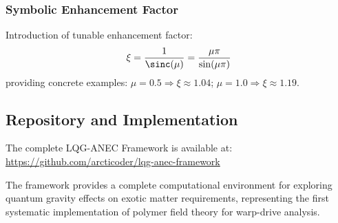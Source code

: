 \documentclass[11pt]{article}
\begin{document}
\subsubsection{Symbolic Enhancement Factor}
Introduction of tunable enhancement factor:
\[
\xi = \frac{1}{\sinc(\mu)} = \frac{\mu\pi}{\sin(\mu\pi)}
\]
providing concrete examples: $\mu = 0.5 \Rightarrow \xi \approx 1.04$; $\mu = 1.0 \Rightarrow \xi \approx 1.19$.

\subsection*{Repository and Implementation}

The complete LQG-ANEC Framework is available at:
\url{https://github.com/arcticoder/lqg-anec-framework}

The framework provides a complete computational environment for exploring quantum gravity effects on exotic matter requirements, representing the first systematic implementation of polymer field theory for warp-drive analysis.
\end{document}
